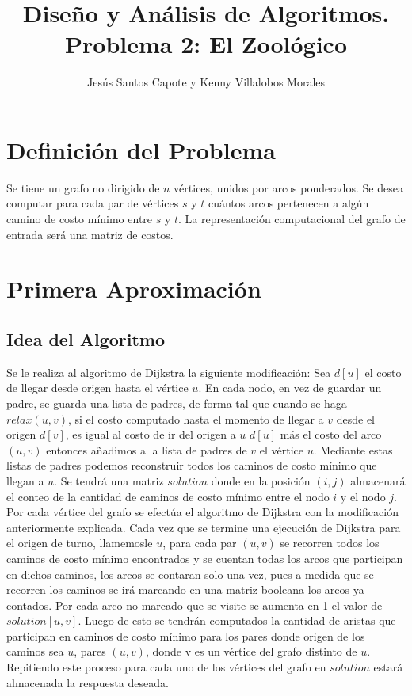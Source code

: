 \documentclass[article]{llncs}
\begin{document}
%
\title{Dise\~{n}o y An\'alisis de Algoritmos. Problema 2: El Zool\'ogico}
%
%
\author{Jes\'us Santos Capote y Kenny Villalobos Morales}
%
%
\maketitle              %
%
\section{Definici\'on del Problema}

Se tiene un grafo no dirigido de $n$ vértices, unidos por arcos ponderados. Se desea computar para cada par 
de vértices $s$ y $t$ cuántos arcos pertenecen a algún camino de costo mínimo entre $s$ y $t$. La 
representación computacional del grafo de entrada será una matriz de costos.

\section{Primera Aproximaci\'on}

\subsection{Idea del Algoritmo}

Se le realiza al algoritmo de Dijkstra la siguiente modificaci\'on: Sea $d[u]$ el costo de llegar desde origen hasta el v\'ertice $u$.   
En cada nodo, en vez de guardar un padre, se guarda una lista de padres, de forma tal que  
cuando se haga $relax(u, v)$, si el costo 
computado hasta el momento de llegar a $v$  desde el origen $d[v]$, es igual al costo de ir del origen a $u$ $d[u]$ m\'as 
el costo del arco $(u,v)$ entonces a\~{n}adimos a la lista de padres de $v$ el v\'ertice $u$. Mediante estas listas de padres
podemos reconstruir todos los caminos de costo m\'inimo que llegan a $u$. Se tendr\'a una matriz \textbf{$solution$}
donde en la posici\'on $(i,j)$ almacenar\'a el conteo de la cantidad de caminos de costo m\'inimo entre el nodo $i$ y el nodo $j$. Por cada 
v\'ertice del grafo se efect\'ua el algoritmo de Dijkstra con la modificaci\'on anteriormente explicada. 
Cada vez que se termine una ejecuci\'on de Dijkstra para el origen de turno, llamemosle $u$, para cada par $(u, v)$ se recorren todos los caminos 
de costo m\'inimo encontrados y se cuentan todas los arcos que participan en dichos caminos, los arcos se 
contaran solo una vez, pues a medida que se recorren los caminos se ir\'a marcando en una matriz booleana los arcos ya contados. Por cada arco no marcado 
que se visite se aumenta en 1 el valor de \textbf{$solution[u, v]$}. 
Luego de esto se tendr\'an 
computados la cantidad de aristas que participan en caminos de costo m\'inimo para los pares donde 
origen de los caminos sea $u$, pares $(u,v)$, donde v es un v\'ertice del grafo distinto de $u$. Repitiendo este proceso para cada uno de los v\'ertices del grafo 
en \textbf{$solution$} estar\'a almacenada la respuesta deseada.
\end{document}
